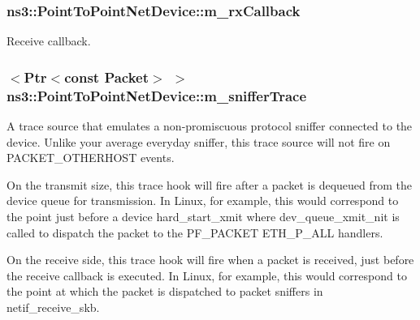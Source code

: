 \subsubsection[{\texorpdfstring{m\+\_\+rx\+Callback}{m_rxCallback}}]{ ns3\+::\+Point\+To\+Point\+Net\+Device\+::m\+\_\+rx\+Callback\hspace{0.3cm}{\ttfamily [private]}}\hypertarget{classns3_1_1PointToPointNetDevice_aed5beceb5bce7b0653dde1371bb8d734}{}\label{classns3_1_1PointToPointNetDevice_aed5beceb5bce7b0653dde1371bb8d734}


Receive callback. 

\subsubsection[{\texorpdfstring{m\+\_\+sniffer\+Trace}{m_snifferTrace}}]{$<${\bf Ptr}$<$const {\bf Packet}$>$ $>$ ns3\+::\+Point\+To\+Point\+Net\+Device\+::m\+\_\+sniffer\+Trace\hspace{0.3cm}{\ttfamily [private]}}\hypertarget{classns3_1_1PointToPointNetDevice_ae62def3355a42b37b41f7d59dc81bb0e}{}\label{classns3_1_1PointToPointNetDevice_ae62def3355a42b37b41f7d59dc81bb0e}
A trace source that emulates a non-\/promiscuous protocol sniffer connected to the device. Unlike your average everyday sniffer, this trace source will not fire on P\+A\+C\+K\+E\+T\+\_\+\+O\+T\+H\+E\+R\+H\+O\+ST events.

On the transmit size, this trace hook will fire after a packet is dequeued from the device queue for transmission. In Linux, for example, this would correspond to the point just before a device {\ttfamily hard\+\_\+start\+\_\+xmit} where {\ttfamily dev\+\_\+queue\+\_\+xmit\+\_\+nit} is called to dispatch the packet to the P\+F\+\_\+\+P\+A\+C\+K\+ET E\+T\+H\+\_\+\+P\+\_\+\+A\+LL handlers.

On the receive side, this trace hook will fire when a packet is received, just before the receive callback is executed. In Linux, for example, this would correspond to the point at which the packet is dispatched to packet sniffers in {\ttfamily netif\+\_\+receive\+\_\+skb}. 
